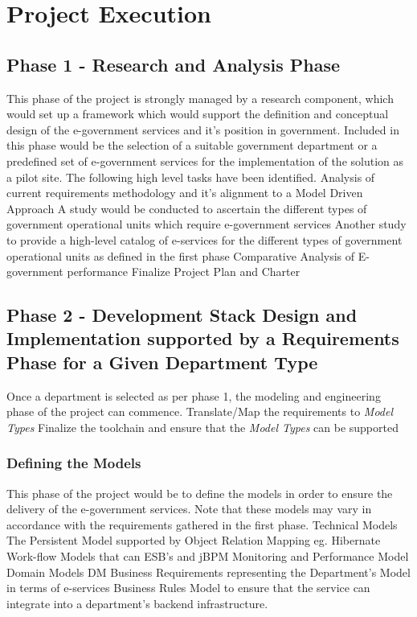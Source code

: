 \section{Project Execution}
\subsection{Phase 1 - Research and Analysis Phase}
This phase of the project is strongly managed by a research component, which would set up a framework which would support the definition and conceptual design of the e-government services and it's position in government.
Included in this phase would be the selection of a suitable government department or a predefined set of e-government services for the implementation of the solution as a pilot site. The following high level tasks have been identified. 
\slist
\spit Analysis of current requirements methodology and it's alignment to a Model Driven Approach
\spit A study would be conducted to ascertain the different types of government operational units which require e-government services
\spit Another study to provide a high-level catalog of e-services for the different types of government operational units as defined in the first phase
\spit Comparative Analysis of E-government performance
\spit Finalize Project Plan and Charter
\elist
\subsection{Phase 2 - Development Stack Design and Implementation supported by a Requirements Phase for a Given Department Type}
Once a department is selected as per phase 1, the modeling and engineering phase of the project can commence.
\slist
\spit Translate/Map the requirements to \textit{Model Types}
\spit Finalize the toolchain and ensure that the \textit{Model Types} can be supported
\elist
\subsubsection{Defining the Models} 
This phase of the project would be to define the models in order to ensure the delivery of the e-government services. Note that these models may vary in accordance with the requirements gathered in the first phase.
\slist
\spit Technical Models
\slist
\spit The Persistent Model supported by Object Relation Mapping eg. Hibernate
\spit Work-flow Models that can ESB's and jBPM
\spit Monitoring and Performance Model
\elist
\spit Domain Models \gls{DM}
\slist
\spit Business Requirements representing the Department's Model in terms of e-services
\spit Business Rules Model to ensure that the service can integrate into a department's backend infrastructure.
\elist
\elist
